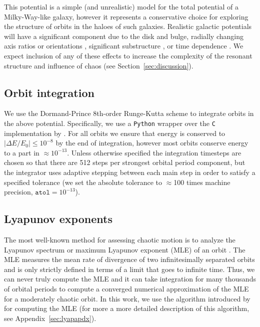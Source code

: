 \documentclass[letterpaper,12pt,preprint]{aastex}
\newcommand{\chchchanges}[1]{{\color{red} {#1}}}
\begin{document}
This potential is a simple (and unrealistic) model for the total potential of a Milky-Way-like galaxy, however it represents a conservative choice for exploring the structure of orbits in the haloes of such galaxies. Realistic galactic potentials will have a significant component due to the disk and bulge, \chchchanges{radially changing axis ratios or orientations \citep[e.g.,][]{romanowsky98, kazantzidis04,debattista08,veraciro11,butsky15}}, significant substructure \citep{moore98,zemp09}, or time dependence \citep[either from bulk rotation, mass growth, mergers, etc.; see, e.g.,][]{bailin05}. We expect inclusion of any of these effects to increase the complexity of the resonant structure and influence of chaos (see Section~\ref{sec:discussion}). 

\subsection{Orbit integration}\label{sec:integration}

We use the Dormand-Prince 8th-order Runge-Kutta scheme \citep{prince81} to integrate orbits in the above potential. Specifically, we use a \texttt{Python} wrapper over the \texttt{C} implementation by \cite{hairer93}. For all orbits we ensure that energy is conserved to $|\Delta E/E_0| \leq 10^{-8}$ by the end of integration, however most orbits conserve energy to a part in $\approx$$10^{-13}$. Unless otherwise specified the integration timesteps are chosen so that there are 512 steps per strongest orbital period component, but the integrator uses adaptive stepping between each main step in order to satisfy a specified tolerance (we set the absolute tolerance to $\approx$100 times machine precision, $\texttt{atol} = 10^{-13}$). 

\subsection{Lyapunov exponents} \label{sec:lyap}

The most well-known method for assessing chaotic motion is to analyze the Lyapunov spectrum or maximum Lyapunov exponent (MLE) of an orbit \chchchanges{\citep{lyapunov92}}. The MLE measures the mean rate of divergence of two infinitesimally separated orbits and is only strictly defined in terms of a limit that goes to infinite time. Thus, we can never truly compute the MLE and it can take integration for many thousands of orbital periods to compute a converged numerical approximation of the MLE for a moderately chaotic orbit. In this work, we use the algorithm introduced by \cite{wolf85} for computing the MLE (for more a more detailed description of this algorithm, see Appendix~\ref{sec:lyapapdx}).
\end{document}
